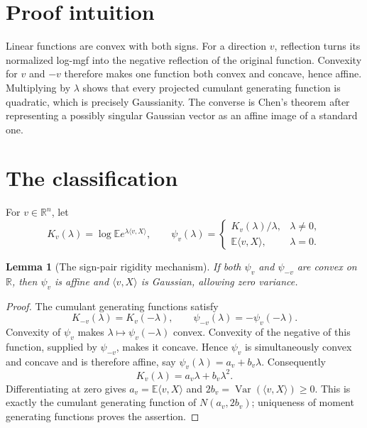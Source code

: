 \documentclass[10pt]{article}
\newtheorem{lemma}{Lemma}
\DeclareMathOperator{\Var}{Var}
\newcommand{\R}{\mathbb R}
\newcommand{\E}{\mathbb E}
\begin{document}
\section{Proof intuition}

Linear functions are convex with both signs.  For a direction $v$, reflection
turns its normalized log-mgf into the negative reflection of the original
function.  Convexity for $v$ and $-v$ therefore makes one function both convex
and concave, hence affine.  Multiplying by $\lambda$ shows that every projected
cumulant generating function is quadratic, which is precisely Gaussianity.
The converse is Chen's theorem after representing a possibly singular
Gaussian vector as an affine image of a standard one.

\section{The classification}

For $v\in\R^n$, let
\[
 K_v(\lambda)=\log\E e^{\lambda\langle v,X\rangle},
 \qquad
 \psi_v(\lambda)=
 \begin{cases}K_v(\lambda)/\lambda,&\lambda\ne0,\\
 \E\langle v,X\rangle,&\lambda=0.
 \end{cases}
\]

\begin{lemma}[The sign-pair rigidity mechanism]\label{lem:sign}
If both $\psi_v$ and $\psi_{-v}$ are convex on $\R$, then $\psi_v$ is
affine and $\langle v,X\rangle$ is Gaussian, allowing zero variance.
\end{lemma}

\begin{proof}
The cumulant generating functions satisfy
\[
 K_{-v}(\lambda)=K_v(-\lambda),
 \qquad
 \psi_{-v}(\lambda)=-\psi_v(-\lambda).
\tag{3}\label{eq:reflection}
\]
Convexity of $\psi_v$ makes $\lambda\mapsto\psi_v(-\lambda)$ convex.
Convexity of the negative of this function, supplied by $\psi_{-v}$, makes
it concave.  Hence $\psi_v$ is simultaneously convex and concave and is
therefore affine, say $\psi_v(\lambda)=a_v+b_v\lambda$.  Consequently
\[
                     K_v(\lambda)=a_v\lambda+b_v\lambda^2.
\]
Differentiating at zero gives
$a_v=\E\langle v,X\rangle$ and
$2b_v=\Var(\langle v,X\rangle)\ge0$.  This is exactly the cumulant
generating function of $N(a_v,2b_v)$; uniqueness of moment generating
functions proves the assertion.
\end{proof}
\end{document}
